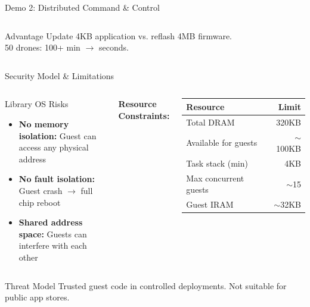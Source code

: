 \documentclass[aspectratio=169, 10pt]{beamer}
\begin{document}
\begin{frame}{Demo 2: Distributed Command \& Control}
\begin{columns}[T]
        \begin{alertblock}{Advantage}
            Update 4KB application vs. reflash 4MB firmware.\\
            50 drones: 100+ min $\to$ seconds.
        \end{alertblock}
    \end{columns}
\end{frame}

\begin{frame}{Security Model \& Limitations}
    \begin{columns}[T]
        \begin{block}{Library OS Risks}
            \begin{itemize}
                \item \textbf{No memory isolation:} Guest can access any physical address
                \item \textbf{No fault isolation:} Guest crash $\to$ full chip reboot
                \item \textbf{Shared address space:} Guests can interfere with each other
            \end{itemize}
        \end{block}

        \textbf{Resource Constraints:}
        \begin{table}
        \begin{tabular}{lr}
        \toprule
        \textbf{Resource} & \textbf{Limit} \\
        \midrule
        Total DRAM & 320KB \\
        Available for guests & $\sim$100KB \\
        Task stack (min) & 4KB \\
        Max concurrent guests & $\sim$15 \\
        Guest IRAM & $\sim$32KB \\
        \bottomrule
        \end{tabular}
        \end{table}
    \end{columns}

    \vspace{0.3cm}
    \begin{alertblock}{Threat Model}
        \centering
        Trusted guest code in controlled deployments. Not suitable for public app stores.
    \end{alertblock}
\end{frame}
\end{document}
